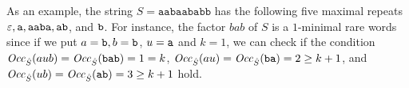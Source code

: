 As an example, the string $S = \texttt{aabaababb}$ has the following five maximal repeats $\tt \varepsilon, a, aaba, ab$, and $\tt b$.
For instance, the factor $bab$ of $S$ is a $1$-minimal rare words since if we put $a = \mathtt{b}, b = \mathtt{b}$, $u = \mathtt{a}$ and $k = 1$, we can check if the condition 
$\mathit{Occ}_{{\hat S}}(aub)= \mathit{Occ}_{{\hat S}}(\mathtt{bab})= 1 = k$, 
$\mathit{Occ}_{{\hat S}}(au) = \mathit{Occ}_{{\hat S}}(\mathtt{ba}) = 2 \ge k+1$, and 
$\mathit{Occ}_{{\hat S}}(ub) = \mathit{Occ}_{{\hat S}}(\mathtt{ab}) = 3 \ge k+1$ hold. 








